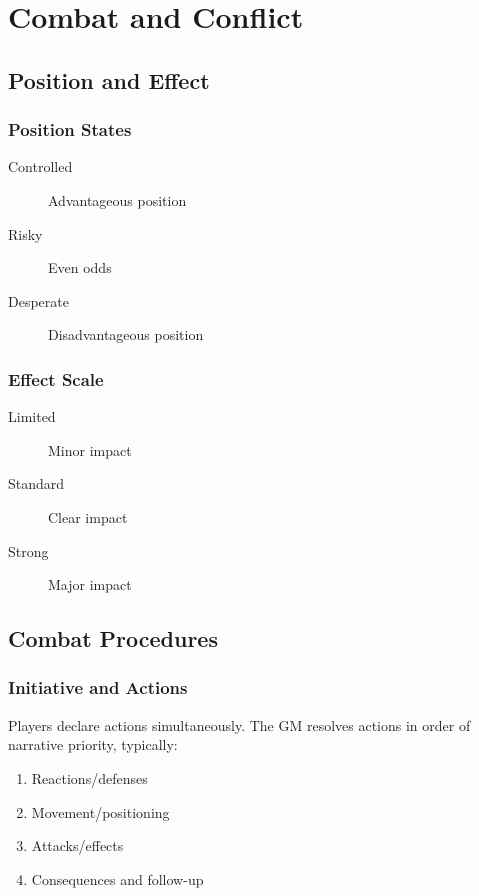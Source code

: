 \chapter{Combat and Conflict}

\section{Position and Effect}

\subsection{Position States}

\begin{description}
\item[Controlled] Advantageous position
\item[Risky] Even odds
\item[Desperate] Disadvantageous position
\end{description}

\subsection{Effect Scale}

\begin{description}
\item[Limited] Minor impact
\item[Standard] Clear impact
\item[Strong] Major impact
\end{description}

\section{Combat Procedures}

\subsection{Initiative and Actions}

Players declare actions simultaneously. The GM resolves actions in order of narrative priority, typically:
\begin{enumerate}
\item Reactions/defenses
\item Movement/positioning
\item Attacks/effects
\item Consequences and follow-up
\end{enumerate}

